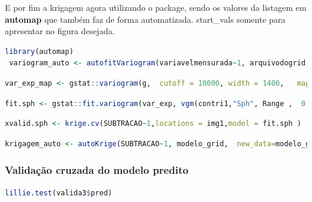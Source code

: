 \hspace*{1.25 cm}  E por fim a krigagem agora utilizando o package, sendo os valores da listagem em  \textbf{\textcolor{blue!55!black}{automap}} que também faz de forma automatizada. start\_vals somente para apresentar no figura desejada.
  \lstset{
 	language=R, %
 	caption= Auto ajuste do Variograma em linguagem R,} %
 \begin{lstlisting}[language=R]
   library(automap)
 variogram_auto <- autofitVariogram(variavelmensurada~1, arquivodogrid, start_vals=c(variogramar$nugget, variogramar$cov.pars[2], variograma$cov.pars[1]))
 \end{lstlisting}  
 
  \lstset{
	language=R, %
	caption= Mapa variografico em linguagem R,} %
\begin{lstlisting}[language=R]
	var_exp_map <- gstat::variogram(g, 	cutoff = 10000,	width = 1400, 	map = T)
\end{lstlisting}  
 
   \lstset{
 	language=R, %
 	caption= Variograma utilizando funcao esférica em linguagem R,} %
 \begin{lstlisting}[language=R]
 	fit.sph <- gstat::fit.variogram(var_exp, vgm(contri1,"Sph", Range ,  0.01))
 \end{lstlisting}  
 
  \lstset{
	language=R, %
	caption= Validação cruzada em linguagem R,} %
\begin{lstlisting}[language=R]
	xvalid.sph <- krige.cv(SUBTRACAO~1,locations = img1,model = fit.sph ) 
\end{lstlisting}  

  \lstset{
	language=R, %
	caption= Krigagem em linguagem R,} %
\begin{lstlisting}[language=R]
	krigagem_auto <- autoKrige(SUBTRACAO~1, modelo_grid,  new_data=modelo_grid, start_vals=c(variofit_geor$nugget, variofit_geor$cov.pars[2], variofit_geor$cov.pars[1]))
\end{lstlisting}  
 
\subsubsection{Validação cruzada do modelo predito }
 
  \lstset{
	language=R, %
	caption= Teste Lilliefors (Kolmogorov\_Smirnov)em linguagem R,} %
\begin{lstlisting}[language=R]
	lillie.test(valida3$pred)
\end{lstlisting}  
 
